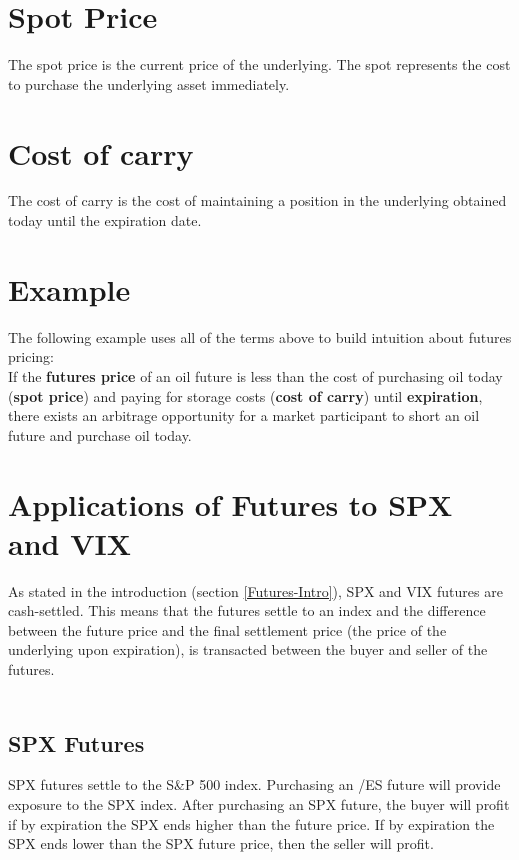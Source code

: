 \documentclass[11pt, oneside]{book}
\begin{document}
\section{Spot Price} \label{Futures-Spot}
The spot price is the current price of the underlying. The spot represents the cost to purchase the underlying asset immediately.

\section{Cost of carry} \label{Futures-Carry}
The cost of carry is the cost of maintaining a position in the underlying obtained today until the expiration date. 

\section{Example} \label{Futures-Example}
The following example uses all of the terms above to build intuition about futures pricing:\\
If the \textbf{futures price} of an oil future is less than the cost of purchasing oil today (\textbf{spot price}) and paying for storage costs (\textbf{cost of carry}) until \textbf{expiration}, there exists an arbitrage opportunity for a market participant to short an oil future and purchase oil today.

\section{Applications of Futures to SPX and VIX} \label{Futures-Applications}
As stated in the introduction (section \ref{Futures-Intro}), SPX and VIX futures are cash-settled. This means that the futures settle to an index and the difference between the future price and the final settlement price (the price of the underlying upon expiration), is transacted between the buyer and seller of the futures.\\
\\
\subsection{SPX Futures} \label{Futures-Applications-SPX}
SPX futures settle to the S\&P 500 index. Purchasing an /ES future will provide exposure to the SPX index. After purchasing an SPX future, the buyer will profit if by expiration the SPX ends higher than the future price. If by expiration the SPX ends lower than the SPX future price, then the seller will profit.
\end{document}
